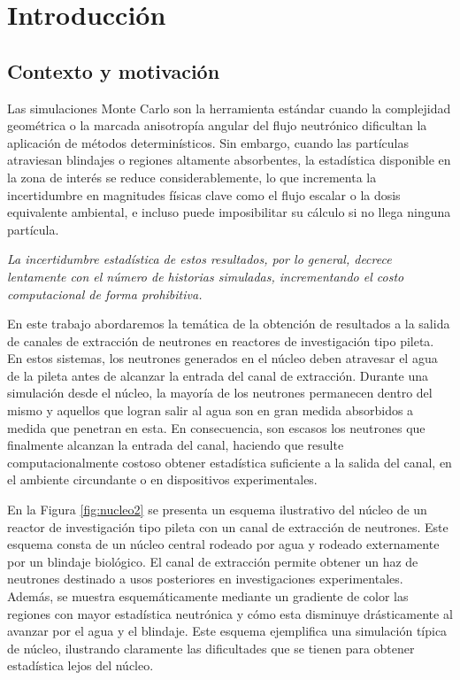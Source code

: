 \chapter{Introducción}

\section{Contexto y motivación}

Las simulaciones Monte Carlo son la herramienta estándar cuando la complejidad geométrica o la marcada anisotropía angular del flujo neutrónico dificultan la aplicación de métodos determinísticos. Sin embargo, cuando las partículas atraviesan blindajes o regiones altamente absorbentes, la estadística disponible en la zona de interés se reduce considerablemente, lo que incrementa la incertidumbre en magnitudes físicas clave como el flujo escalar o la dosis equivalente ambiental, e incluso puede imposibilitar su cálculo si no llega ninguna partícula. 

\emph{La incertidumbre estadística de estos resultados, por lo general, decrece lentamente con el número de historias simuladas, incrementando el costo computacional de forma prohibitiva.}

En este trabajo abordaremos la temática de la obtención de resultados a la salida de canales de extracción de neutrones en reactores de investigación tipo pileta. En estos sistemas, los neutrones generados en el núcleo deben atravesar el agua de la pileta antes de alcanzar la entrada del canal de extracción. Durante una simulación desde el núcleo, la mayoría de los neutrones permanecen dentro del mismo y aquellos que logran salir al agua son en gran medida absorbidos a medida que penetran en esta. En consecuencia, son escasos los neutrones que finalmente alcanzan la entrada del canal, haciendo que resulte computacionalmente costoso obtener estadística suficiente a la salida del canal, en el ambiente circundante o en dispositivos experimentales.

En la Figura \ref{fig:nucleo2} se presenta un esquema ilustrativo del núcleo de un reactor de investigación tipo pileta con un canal de extracción de neutrones. Este esquema consta de un núcleo central rodeado por agua y rodeado externamente por un blindaje biológico. El canal de extracción permite obtener un haz de neutrones destinado a usos posteriores en investigaciones experimentales. Además, se muestra esquemáticamente mediante un gradiente de color las regiones con mayor estadística neutrónica y cómo esta disminuye drásticamente al avanzar por el agua y el blindaje. Este esquema ejemplifica una simulación típica de núcleo, ilustrando claramente las dificultades que se tienen para obtener estadística lejos del núcleo.

